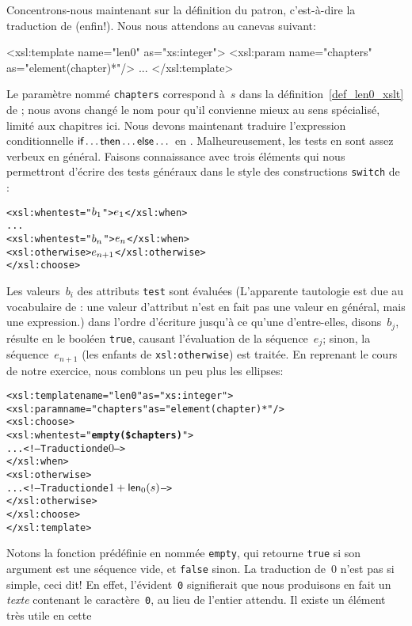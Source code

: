 Concentrons-nous maintenant sur la définition du patron, c'est-à-dire
la traduction de  (enfin!). Nous nous attendons au
canevas suivant:
\begin{sverb}
  <xsl:template name="len0" as="xs:integer">
    <xsl:param name="chapters" as="element(chapter)*"/>
    ...
  </xsl:template>
\end{sverb}
Le paramètre nommé \texttt{chapters} correspond à~\(s\) dans la
définition~\eqref{def_len0_xslt} de ; nous avons
changé le nom pour qu'il convienne mieux au sens spécialisé, limité
aux chapitres ici. Nous devons maintenant traduire l'expression
conditionnelle \(\textsf{if} \dots \textsf{then} \dots \textsf{else} \dots\) en
\XSLT. Malheureusement, les tests en \XSLT sont assez verbeux en
général. Faisons connaissance avec trois éléments qui nous permettront
d'écrire des tests généraux dans le style des constructions
\texttt{switch} de \Java:
\begin{alltt}
  <xsl:when test="\(b\sb{1}\)">\(e\sb{1}\)</xsl:when>
  ...
  <xsl:when test="\(b\sb{n}\)">\(e\sb{n}\)</xsl:when>
  <xsl:otherwise>\(e\sb{n+1}\)</xsl:otherwise>
</xsl:choose>
\end{alltt}
Les valeurs~\(b_i\) des attributs \texttt{test} sont évaluées
(L'apparente tautologie est due au vocabulaire de \XSLT: une valeur
d'attribut n'est en fait pas une valeur en général, mais une
expression.) dans l'ordre d'écriture jusqu'à ce qu'une d'entre-elles,
disons~\(b_j\), résulte en le booléen \texttt{true}, causant
l'évaluation de la séquence~\(e_j\); sinon, la séquence~\(e_{n+1}\)
(les enfants de \texttt{xsl:otherwise}) est traitée. En reprenant le
cours de notre exercice, nous comblons un peu plus les ellipses:
\begin{alltt}
\small  <xsl:template name="len0" as="xs:integer">
    <xsl:param name="chapters" as="element(chapter)*"/>
    <xsl:choose>
      <xsl:when test="\textbf{empty(\$chapters)}">
        ... <!-- Traduction de \(0\) -->
      </xsl:when>
      <xsl:otherwise>
        ... <!-- Traduction de \(1 + \fun{len}\sb{0}(s)\) -->
      </xsl:otherwise>
    </xsl:choose>
  </xsl:template>
\end{alltt}
Notons la fonction prédéfinie en \XSLT nommée \texttt{empty}, qui
retourne \texttt{true} si son argument est une séquence vide, et
\texttt{false} sinon. La traduction de~\(0\) n'est pas si simple, ceci
dit! En effet, l'évident~\texttt{0} signifierait que nous produisons
en fait un \emph{texte} contenant le caractère~\texttt{0}, au lieu de
l'entier attendu. Il existe un élément \XSLT très utile en cette
